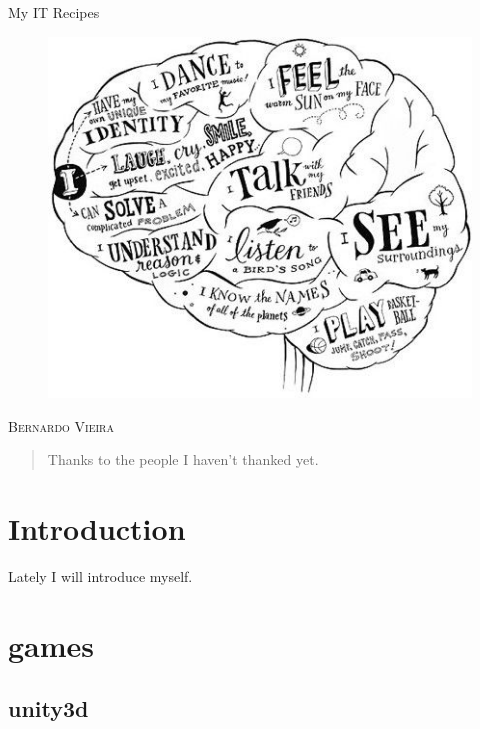 \documentclass{report}
\begin{document}
\begin{titlepage}
\vspace*{\fill}
\begin{center}
{\fontsize{50}{60}\selectfont My IT Recipes}\\[0.5cm]
\begin{figure}[h]
\begin{center}
\includegraphics[scale=0.5]{Figs/brain.jpg}
\end{center}
\end{figure}
\vspace{4em}
\textsc{\Large Bernardo Vieira}\\[1em]
\end{center}
\vspace*{\fill}
\end{titlepage}


\begin{abstract}
Thanks to the people I haven't thanked yet.
\end{abstract}
\clearpage
\tableofcontents
\clearpage

\chapter{Introduction}
Lately I will introduce myself.

\chapter{games}
\section{unity3d}
\end{document}
